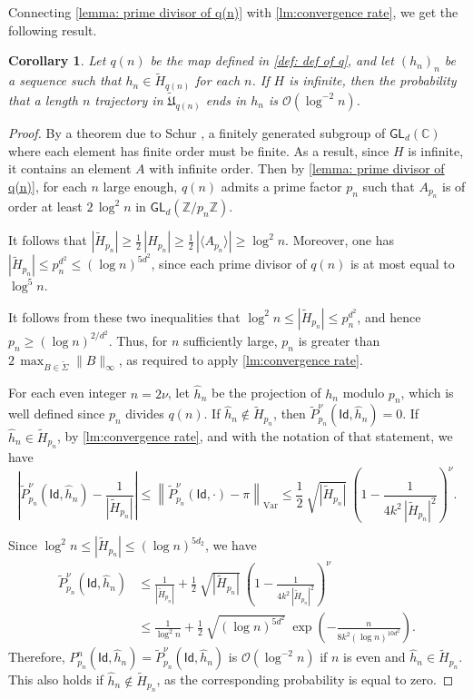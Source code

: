 \documentclass{article}
\def\alph{\tilde{\Sigma}}
\def\Id{\textsf{Id}}
\def\O{\mathcal{O}}
\def\tU{\tilde{\mathfrak{U}}}
\def\tH{\tilde{H}}
\def\tP{\tilde{P}}
\def\C{\mathbb{C}}
\def\Z{\mathbb{Z}}
\def\GL{\textsf{GL}}
\theoremstyle{plain}
\newtheorem{corollary}[theorem]{Corollary}
\theoremstyle{definition}
\begin{document}
Connecting \cref{lemma: prime divisor of q(n)} with \cref{lm:convergence rate}, we get the following result.

\begin{corollary}\label{cor:convergence uniform lazy}
%
Let $q(n)$ be the map defined in \cref{def: def of q}, and let $(h_n)_n$ be a sequence such that $h_n \in \tH_{q(n)}$ for each $n$. 
%
If $H$ is infinite, then the probability that a length $n$ trajectory in $\tU_{q(n)}$ ends in $h_n$ is $\O(\log^{-2}n)$.
%
\end{corollary}


\begin{proof}
%
By a theorem due to Schur \cite{1911:Schur}, a finitely generated subgroup of $\GL_d(\C)$ where each element has finite order must be finite. As a result, since $H$ is infinite, it contains an element $A$ with infinite order. Then by \cref{lemma: prime divisor of q(n)}, for each $n$ large enough, $q(n)$ admits a prime factor $p_n$ such that $A_{p_n}$ is of order at least $2\,\log^2 n$ in $\GL_d(\Z/p_n\Z)$. 

It follows that $|\tH_{p_n}| \ge \frac12\,|H_{p_n}| \ge \frac12\,|\langle A_{p_n}\rangle| \ge \log^2 n$. Moreover, one has $|\tH_{p_n}| \le p_n^{d^2} \le (\log n)^{5d^2}$, since each prime divisor of $q(n)$ is at most equal to $\log^5n$.

It follows from these two inequalities that $\log^2 n \le |\tH_{p_n}| \le p_n^{d^2}$, and hence $p_n\geq (\log n)^{2/d^2}$. Thus, for $n$ sufficiently large, $p_n$ is greater than $2\,\max_{B\in \alph}\|B\|_\infty$, as required to apply \cref{lm:convergence rate}.


For each even integer $n=2\nu$, let $\hat h_n$ be the projection of $h_n$ modulo $p_n$, which is well defined since $p_n$ divides $q(n)$.
If $\hat h_n \notin \tH_{p_n}$, then $\tP_{p_n}^\nu(\Id,\hat h_n) = 0$. If $\hat h_n\in \tH_{p_n}$, by \cref{lm:convergence rate}, and with the notation of that statement, we have
%
\[
\left|\tP_{p_n}^\nu(\Id,\hat h_n) -  \frac1{|\tH_{p_n}|}\right| \le \left\| \tP_{p_n}^\nu(\Id,\cdot) - \pi \right\|_{\text{Var}}
\leq \frac12\ \sqrt{|\tH_{p_n}|}\ \left(1-\frac1{4k^2\,|\tH_{p_n}|^2}\right)^{\nu}.
\]

Since $\log^2n\leq |\tH_{p_n}|\leq (\log n)^{5d_2}$, we have
%
\begin{align*}
%
\tP_{p_n}^\nu(\Id,\hat h_n) &\le \frac1{|\tH_{p_n}|} + \frac12\ \sqrt{|\tH_{p_n}|}\  \left(1-\frac1{4k^2\,|\tH_{p_n}|^2}\right)^{\nu} \\
%
&\le \frac{1}{\log^{2}n} + \frac12\ \sqrt{(\log n)^{5d^2}}\ \exp\left(-\frac{n}{8k^2(\log n)^{10d^2}}\right).
%
\end{align*}
Therefore, $P_{p_n}^n(\Id,\hat h_n) = \tP_{p_n}^\nu(\Id,\hat h_n)$ is $\O(\log^{-2}n)$ if $n$ is even and $\hat h_n\in\tH_{p_n}$. This also holds if
$\hat h_n\notin \tH_{p_n}$, as the corresponding probability is equal to zero.


\end{proof}
\end{document}
